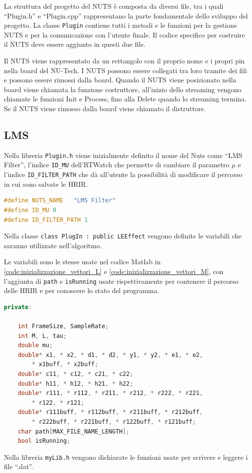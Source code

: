 \documentclass[12pt,a4paper,titlepage]{article}
\begin{document}
La struttura del progetto del NUTS è composta da diversi file, tra i quali ``Plugin.h'' e ``Plugin.cpp'' rappresentano la parte fondamentale dello sviluppo del progetto. La classe \texttt{Plugin} contiene tutti i metodi e le funzioni per la gestione NUTS e per la comunicazione con l'utente finale. Il codice specifico per costruire il NUTS deve essere aggiunto in questi due file.

Il NUTS viene rappresentato da un rettangolo con il proprio nome e i propri pin nella board del NU-Tech. I NUTS possono essere collegati tra loro tramite dei fili e possono essere rimossi dalla board. Quando il NUTS viene posizionato nella board viene chiamata la funzione costruttore, all'inizio dello streaming vengono chiamate le funzioni Init e Process, fino alla Delete quando lo streaming termina. Se il NUTS viene rimosso dalla board viene chiamato il distruttore.

\subsection{LMS}
\label{subsec:codice_c_lms}
Nella libreria \texttt{Plugin.h} viene inizialmente definito il nome del Nuts come ``LMS Filter'', l’indice \texttt{ID\_MU} dell'RTWatch che permette di cambiare
il parametro $\mu$ e l'indice \texttt{ID\_FILTER\_PATH} che dà all'utente la possibilità di modificare il percorso in cui sono salvate le HRIR.

\begin{lstlisting}[language=cpp, label = dichiarazione_costanti_lms, caption = Dichiarazione delle costanti in \texttt{Plugin.h}, captionpos = b]
#define NUTS_NAME	"LMS Filter"
#define ID_MU 0 
#define ID_FILTER_PATH 1
\end{lstlisting}
Nella classe \texttt{class PlugIn :	public LEEffect} vengono definite le variabili che saranno utilizzate nell'algoritmo.

Le variabili sono le stesse usate nel codice Matlab in \ref{code:inizializzazione_vettori_L} e \ref{code:inizializzazione_vettori_M}, con l'aggiunta di \texttt{path} e \texttt{isRunning} usate rispettivamente per contenere il percorso delle HRIR e per conoscere lo stato del programma.
\begin{lstlisting}[language=cpp, label=code:variabili_lms, caption = Dichiarazione delle variabili in \texttt{Plugin.h}, breaklines = false, captionpos = b]
private:

	int FrameSize, SampleRate;
	int M, L, tau;
	double mu;
	double* x1, * x2, * d1, * d2, * y1, * y2, * e1, * e2,
		* x1buff, * x2buff;
	double* c11, * c12, * c21, * c22;
	double* h11, * h12, * h21, * h22;
	double* r111, * r112, * r211, * r212, * r222, * r221, 
		* r122, * r121;
	double* r111buff, * r112buff, * r211buff, * r212buff, 
		* r222buff, * r221buff, * r122buff, * r121buff;
	char path[MAX_FILE_NAME_LENGTH];
	bool isRunning;
\end{lstlisting}
Nella libreria \texttt{myLib.h} vengono dichiarate le funzioni usate per scrivere e leggere i file ``.dat''.
\end{document}
